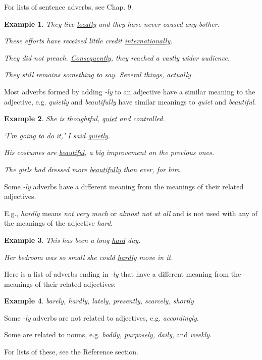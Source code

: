 \documentclass[oneside]{book}
\numberwithin{equation}{section}
\newtheorem{example}{Example}[section]
\begin{document}
For lists of sentence adverbs, see Chap. 9.
\begin{example}
    They live \underline{locally} and they have never caused any bother.
    
    These efforts have received little credit \underline{internationally}.
    
    They did not preach. \underline{Consequently}, they reached a vastly wider audience.
    
    They still remains something to say. Several things, \underline{actually}.
\end{example}
%
\noindent{} Most adverbs formed by adding \textit{-ly} to an adjective have a similar meaning to the adjective, e.g. \textit{quietly} and \textit{beautifully} have similar meanings to \textit{quiet} and \textit{beautiful}.
\begin{example}
    She is thoughtful, \underline{quiet} and controlled.
    
    `I'm going to do it,' I said \underline{quietly}.
    
    His costumes are \underline{beautiful}, a big improvement on the previous ones.
    
    The girls had dressed more \underline{beautifully} than ever, for him.
\end{example}
%
\noindent{} Some \textit{-ly} adverbs have a different meaning from the meanings of their related adjectives.

E.g., \textit{hardly} means \textit{not very much} or \textit{almost not at all} and is not used with any of the meanings of the adjective \textit{hard}.
\begin{example}
    This has been a long \underline{hard} day.
    
    Her bedroom was so small she could \underline{hardly} move in it.
\end{example}
Here is a list of adverbs ending in \textit{-ly} that have a different meaning from the meanings of their related adjectives:
\begin{example}
    barely, hardly, lately, presently, scarcely, shortly
\end{example}
%
\noindent{} Some \textit{-ly} adverbs are not related to adjectives, e.g. \textit{accordingly}.

Some are related to nouns, e.g. \textit{bodily, purposely, daily}, and \textit{weekly}.

For lists of these, see the Reference section.
\end{document}
